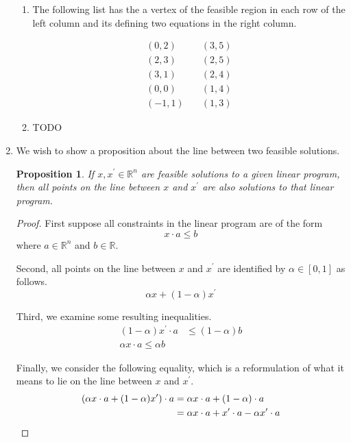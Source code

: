 \documentclass[letterpaper,11pt]{article}
\newtheorem{proposition}{Proposition}
\newcommand{\R}{\mathbb{R}}
\begin{document}
\begin{enumerate}
\begin{enumerate}
            \item The following list has the a vertex of the feasible region in
                each row of the left column and its defining two equations in
                the right column.

                \begin{align*}
                    (0, 2)  &\quad (3, 5) \\
                    (2, 3)  &\quad (2, 5) \\
                    (3, 1)  &\quad (2, 4) \\
                    (0, 0)  &\quad (1, 4) \\
                    (-1, 1) &\quad (1, 3)
                \end{align*}

            \item TODO

        \end{enumerate}

    \item We wish to show a proposition about the line between two feasible
        solutions.

        \begin{proposition}
            If $x,x^\prime \in \R^n$ are feasible solutions to a given linear
            program, then all points on the line between $x$ and $x^\prime$ are
            also solutions to that linear program.
        \end{proposition}

        \begin{proof}
            First suppose all constraints in the linear program are of the form
            $$
            x \cdot a \leq b
            $$
            where $a \in \R^n$ and $b \in \R$.

            Second, all points on the line between $x$ and $x^\prime$ are identified by
            $\alpha \in [0,1]$ as follows.
            $$
            \alpha x + (1-\alpha)x^\prime
            $$

            Third, we examine some resulting inequalities.
            \begin{align}
                (1 - \alpha)x^\prime \cdot a & \leq (1 - \alpha) b \label{ineq:oneminusalphax} \\
                \alpha x \cdot a \leq \alpha b \label{ineq:alphax}
            \end{align}

            Finally, we consider the following equality, which is a
            reformulation of what it means to lie on the line between $x$ and
            $x^\prime$.
            \begin{align}
                (\alpha x \cdot a + (1 - \alpha) x^\prime) \cdot a
                &= \alpha x \cdot a + (1 - \alpha) \cdot a \notag \\
                &= \alpha x \cdot a + x^\prime \cdot a - \alpha x^\prime \cdot a \label{eq:qed}
            \end{align}


\end{proof}
\end{enumerate}
\end{document}
